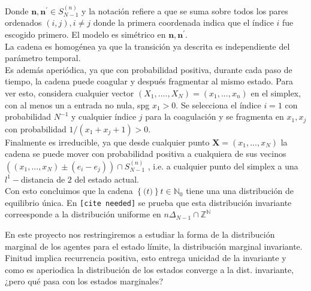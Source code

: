 \documentclass[10pt]{article}
\newcommand{\N}{\mathbb N}
\newcommand{\Z}{\mathbb Z}
\theoremstyle{plain}
\theoremstyle{definition}
\begin{document}
Donde $\mathbf{n}, \mathbf{n}^{\prime}\in S_{N-1}^{(n)}$ y la notación refiere a que se suma sobre todos los pares ordenados $(i,j), i\neq j$ donde la primera coordenada indica que el índice $i$ fue escogido primero. El modelo es simétrico en $\mathbf{n}, \mathbf{n}^{\prime}$.\\
La cadena es homogénea ya que la transición ya descrita es independiente del parámetro temporal. \\
Es además aperiódica, ya que con probabilidad positiva, durante cada paso de tiempo, la cadena puede coagular y después fragmentar al mismo estado.
Para ver esto, considera cualquier vector $(X_{1},...., X_{N}) = (x_{1},..., x_{n})$ en el simplex, con al menos un a entrada no nula, spg $x_{1}>0$. Se selecciona el índice $i=1$ con probabilidad $N^{-1}$ y cualquier índice $j$ para la coagulación y se fragmenta en $x_{1}, x_{j}$ con probabilidad $1/(x_{1}+x_{j}+1)>0$.\\
Finalmente es irreducible, ya que desde cualquier punto $\mathbf{X} = (x_{1},...,x_{N})$ la cadena se puede mover con probabilidad positiva a cualquiera de sus vecinos 
{ $( (x_{1},...,x_{N}) \pm (e_{i}-e_{j}) ) \cap S_{N-1}^{(n) }$ }, i.e. a cualquier punto del simplex a una $l^{1}-$distancia de $2$ del estado actual. \\

Con esto concluimos que la cadena $\left\{ \mathbf(t) \right\} t\in \N_{0}$ tiene una una distribución de equilibrio única. En \texttt{[cite needed]} se prueba que esta distribución invariante correesponde a la distribución uniforme en $n\Delta_{N-1} \cap \Z^{\N}$


En este proyecto nos restringiremos a estudiar la forma de la distribución marginal de los agentes para el estado límite, la distribución marginal invariante.
Finitud implica recurrencia positiva, esto entrega unicidad de la invariante y como es aperiodica la distribución de los estados converge a la dist. invariante, ¿pero qué pasa con los estados marginales?
\end{document}
